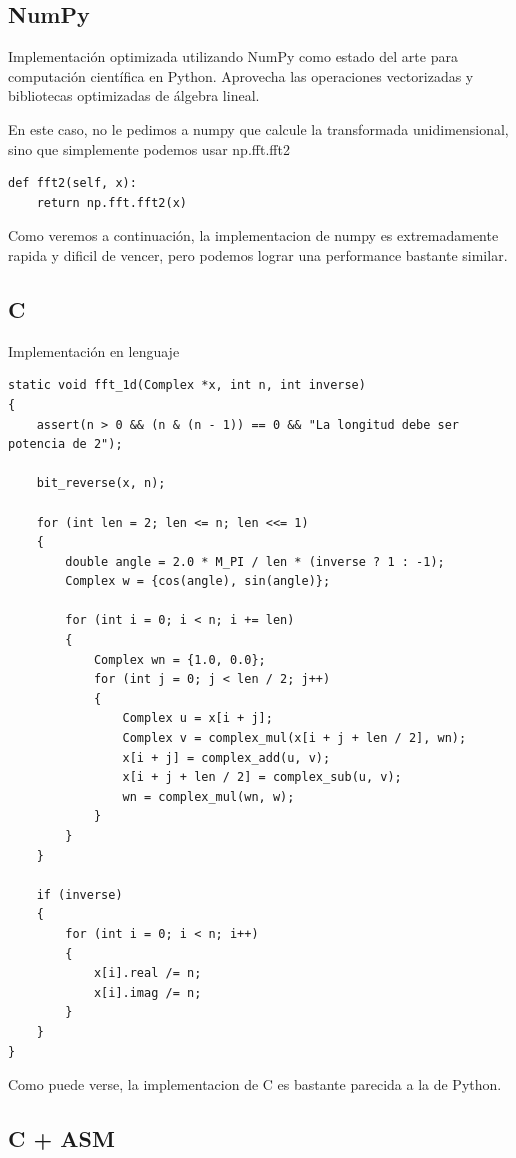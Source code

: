 \documentclass[a4paper]{article}
\begin{document}
\subsection{NumPy}

Implementación optimizada utilizando NumPy como estado del arte para computación científica en Python. Aprovecha las operaciones
vectorizadas y bibliotecas optimizadas de álgebra lineal.

En este caso, no le pedimos a numpy que calcule la transformada unidimensional, sino que simplemente podemos usar np.fft.fft2

\begin{verbatim}
def fft2(self, x):
    return np.fft.fft2(x)
\end{verbatim}

Como veremos a continuación, la implementacion de numpy es extremadamente rapida y dificil de vencer, pero podemos lograr una
performance bastante similar.

\subsection{C}
Implementación en lenguaje

\begin{verbatim}
static void fft_1d(Complex *x, int n, int inverse)
{
    assert(n > 0 && (n & (n - 1)) == 0 && "La longitud debe ser potencia de 2");

    bit_reverse(x, n);

    for (int len = 2; len <= n; len <<= 1)
    {
        double angle = 2.0 * M_PI / len * (inverse ? 1 : -1);
        Complex w = {cos(angle), sin(angle)};

        for (int i = 0; i < n; i += len)
        {
            Complex wn = {1.0, 0.0};
            for (int j = 0; j < len / 2; j++)
            {
                Complex u = x[i + j];
                Complex v = complex_mul(x[i + j + len / 2], wn);
                x[i + j] = complex_add(u, v);
                x[i + j + len / 2] = complex_sub(u, v);
                wn = complex_mul(wn, w);
            }
        }
    }

    if (inverse)
    {
        for (int i = 0; i < n; i++)
        {
            x[i].real /= n;
            x[i].imag /= n;
        }
    }
}
\end{verbatim}

Como puede verse, la implementacion de C es bastante parecida a la de Python.

\subsection{C + ASM}
\end{document}
